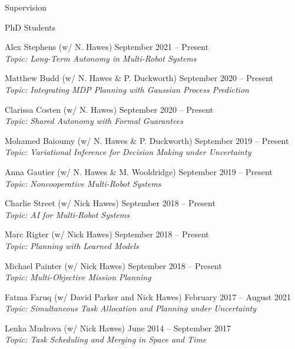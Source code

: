 
\begin{rSection}{Supervision}

\begin{rSubsection}{PhD Students}{}{}{}
\item Alex Stephens  (w/ N. Hawes) \hfill September 2021 -- Present\\
\textit{Topic: Long-Term Autonomy in Multi-Robot Systems}

\item Matthew Budd  (w/ N. Hawes \& P. Duckworth) \hfill September 2020 -- Present\\
\textit{Topic: Integrating MDP Planning with Gaussian Process Prediction}

\item Clarissa Costen  (w/ N. Hawes) \hfill September 2020 -- Present\\
\textit{Topic: Shared Autonomy with Formal Guarantees}

\item Mohamed Baioumy  (w/ N. Hawes \& P. Duckworth) \hfill September 2019 -- Present\\
\textit{Topic: Variational Inference for Decision Making under Uncertainty}

\item Anna Gautier (w/ N. Hawes \& M. Wooldridge) \hfill September 2019 -- Present\\
\textit{Topic: Noncooperative Multi-Robot Systems}

\item  Charlie Street (w/ Nick Hawes) \hfill September 2018 -- Present\\
\textit{Topic: AI for Multi-Robot Systems}

\item  Marc Rigter (w/ Nick Hawes) \hfill September 2018 -- Present\\
\textit{Topic: Planning with Learned Models}

\item  Michael Painter  (w/ Nick Hawes) \hfill September 2018 -- Present\\
\textit{Topic: Multi-Objective Mission Planning}

\item  Fatma Faruq  (w/ David Parker and Nick Hawes) \hfill February 2017 -- August 2021\\
\textit{Topic: Simultaneous Task Allocation and Planning under Uncertainty}

\item  Lenka Mudrova (w/ Nick Hawes) \hfill June 2014 -- September 2017\\
\textit{Topic: Task Scheduling and Merging in Space and Time}


\end{rSubsection}
\end{rSection}
